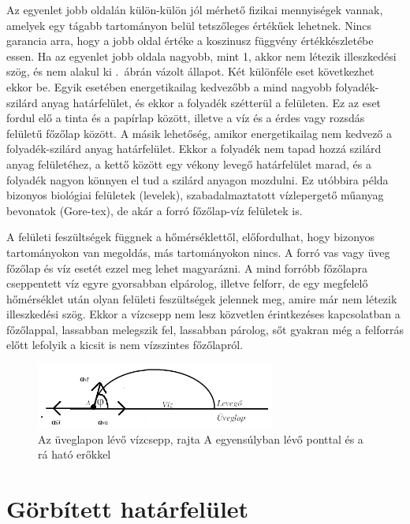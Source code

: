 \documentclass[12pt,a4paper]{scrartcl}
\begin{document}
Az egyenlet jobb oldalán külön-külön jól mérhető fizikai mennyiségek vannak, amelyek egy tágabb tartományon belül tetszőleges értékűek lehetnek. Nincs garancia arra, hogy a jobb oldal értéke a koszinusz függvény értékkészletébe essen. Ha az egyenlet jobb oldala nagyobb, mint 1, akkor nem létezik illeszkedési szög, és nem alakul ki .\ ábrán vázolt állapot. Két különféle eset következhet ekkor be. Egyik esetében energetikailag kedvezőbb a mind nagyobb folyadék-szilárd anyag határfelület, és ekkor a folyadék szétterül a felületen. Ez az eset fordul elő a tinta és a papírlap között, illetve a víz és a érdes vagy rozsdás felületű főzőlap között. A másik lehetőség, amikor energetikailag nem kedvező a folyadék-szilárd anyag határfelület. Ekkor a folyadék nem tapad hozzá szilárd anyag felületéhez, a kettő között egy vékony levegő határfelület marad, és a folyadék nagyon könnyen el tud a szilárd anyagon mozdulni. Ez utóbbira példa bizonyos biológiai felületek (levelek), szabadalmaztatott vízlepergető műanyag bevonatok (Gore-tex), de akár a forró főzőlap-víz felületek is.

A felületi feszültségek függnek a hőmérséklettől, előfordulhat, hogy bizonyos tartományokon van megoldás, más tartományokon nincs. A forró vas vagy üveg főzőlap és víz esetét ezzel meg lehet magyarázni. A mind forróbb főzőlapra cseppentett víz egyre gyorsabban elpárolog, illetve felforr, de egy megfelelő hőmérséklet után olyan felületi feszültségek jelennek meg, amire már nem létezik illeszkedési szög. Ekkor a vízcsepp nem lesz közvetlen érintkezéses kapcsolatban a főzőlappal, lassabban melegszik fel, lassabban párolog, sőt gyakran még a felforrás előtt lefolyik a kicsit is nem vízszintes főzőlapról.

\begin{figure}[htbp]
	\begin{center}
		\includegraphics[width=0.7\textwidth]{tetel72.png}
		\caption{Az üveglapon lévő vízcsepp, rajta A egyensúlyban lévő ponttal és a rá ható erőkkel \label{fig:illeszkedesi_szog}}
	\end{center}
\end{figure}

\section{Görbített határfelület}
\end{document}
